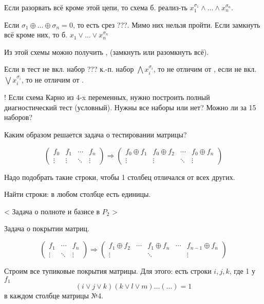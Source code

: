 \documentclass[final]{report}
\theoremstyle {remark}
\theoremstyle {remark}
\begin{document}
Если разорвать всё кроме этой цепи, то схема б. реализ-ть
$ x_1^{\sigma_1} \land \ldots \land x_n^{\sigma_n} $.

Если $ \sigma_1 \oplus \ldots \oplus \sigma_n = 0 $, то есть срез ???.
Мимо них нельзя пройти. Если замкнуть всё кроме них, то б.
$ x_1^{} \lor \ldots \lor x_n^{\sigma_n} $

Из этой схемы можно получить ,  (замкнуть или разомкнуть
всё).

Если в тест не вкл. набор ??? к.-п. набор $ \bigwedge x_i^{\sigma_i} $,
то не отличим от , если не вкл. $ \bigvee x_i^{\overline{\sigma_i}} $, то
не отличим от .

! Если схема Карно из 4-x переменных, нужно построить полный диагностический
тест (условный). Нужны все наборы или нет? Можно ли за 15 наборов?

Каким образом решается задача о тестировании матрицы?

$$
\begin{pmatrix}
	f_0 & f_1 & \cdots & f_n \\
	\vdots & \vdots & \ddots & \vdots
\end{pmatrix}
\Rightarrow
\begin{pmatrix}
	f_0 \oplus f_1 & f_0 \oplus f_2 & \cdots & f_0 \oplus f_n \\
	\vdots & \vdots & \ddots & \vdots
\end{pmatrix}
$$

Надо подобрать такие строки, чтобы 1 столбец отличался от всех других.

Найти строки: в любом столбце есть единицы.

< Задача о полноте и базисе в $ P_2 $ >

Задача о покрытии матриц.

$$
\begin{pmatrix}
	f_1 & \cdots & f_n \\
	\vdots & \ddots & \vdots
\end{pmatrix}
\Rightarrow
\begin{pmatrix}
	f_1 \oplus f_2 & \cdots & f_1 \oplus f_n & \cdots & f_{n-1} \oplus f_n \\
	\vdots & & \ddots & & \vdots
\end{pmatrix}
$$

Строим все тупиковые покрытия матрицы. Для этого: есть строки $ i, j, k $,
где 1 у $ f_1 $
\[
	( i \lor j \lor k ) ( k \lor l \lor m ) \ldots ( \ldots ) = 1
\]
в каждом столбце матрицы №4.
\end{document}
